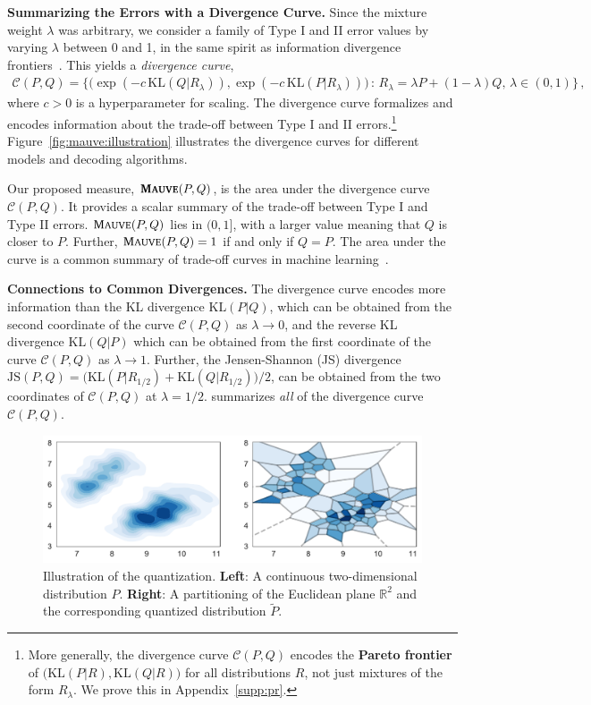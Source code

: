 \documentclass{article}
\newcommand{\myparagraph}[1]{\par\noindent\textbf{{#1}.}} %
\newcommand \Ccal {\mathcal C}
\theoremstyle{definition}
\newcommand{\kl}{{\mathrm{KL}}}
\newcommand \reals {\mathbb{R}}
\newcommand{\name}{{\fontfamily{bch}\selectfont{\textsc{Mauve}}}\xspace}
\begin{document}
\myparagraph{Summarizing the Errors with a Divergence Curve}
Since the mixture weight $\lambda$ was arbitrary, 
we consider a family of Type I and II error values by varying $\lambda$ between 0 and 1,
in the same spirit as information divergence frontiers~\citep{sajjadi2018assessing,djolonga2020precision}.
This yields a {\em divergence curve},
\begin{align} \label{eq:div-curve}
    \Ccal(P, Q) =
    \Big\{ \big(\exp(-c\, \kl(Q|R_\lambda)), \exp(-c\, \kl(P|R_\lambda)) \big)
    \, :\, 
    R_\lambda = \lambda P + (1-\lambda)Q, \,
    \lambda \in (0, 1) \Big\} \,,
\end{align}
where $c > 0$ is a hyperparameter 
for scaling.
The divergence curve formalizes and encodes information about the trade-off between Type I and II errors.\footnote{More generally, 
the divergence curve $\Ccal(P, Q)$
encodes the \textbf{Pareto frontier}
of $\big(\kl(P|R), \kl(Q|R)\big)$
for all distributions $R$,
not just mixtures of the form $R_\lambda$. 
We prove this in Appendix~\ref{supp:pr}.
%
}
%
Figure~\ref{fig:mauve:illustration} illustrates the divergence curves for different models and decoding algorithms.


Our proposed measure, 
$\textbf{\name}(P,Q)$, is the area under the divergence curve $\Ccal(P, Q)$. 
It provides a scalar summary of the trade-off between Type I and Type II errors.
$\name(P,Q)$ lies in $(0,1]$, with a larger value 
meaning that $Q$ is closer to $P$. Further, 
$\name(P, Q) = 1$ if and only if $Q=P$. %
The area under the curve is a common summary of trade-off curves in machine learning~\cite{cortes2005confidence,clemencon2009precision, clemenccon2010overlaying, flach2012machine}.

\myparagraph{Connections to Common Divergences}
The divergence curve encodes more information
than the KL divergence $\kl(P|Q)$, which can be obtained from the second coordinate of the curve $\Ccal(P, Q)$ as $\lambda \to 0$, and the reverse KL divergence $\kl(Q|P)$ which can be obtained from the first coordinate of the curve $\Ccal(P, Q)$ as $\lambda \to 1$. 
%
%
Further, the Jensen-Shannon (JS) divergence $\mathrm{JS}(P, Q) = \big(\kl(P|R_{1/2}) + \kl(Q|R_{1/2})\big)/2$, 
can be obtained from the two coordinates of $\Ccal(P, Q)$ at $\lambda=1/2$.
\name summarizes {\em all} of the divergence curve $\Ccal(P, Q)$.



\begin{figure}[t]
    \centering
    \includegraphics[width=0.8\linewidth]{fig/illustration/quant.pdf}
    \caption{\small
    Illustration of the quantization.
    \textbf{Left}: A continuous two-dimensional distribution $P$.
    \textbf{Right}: A partitioning of the Euclidean plane $\reals^2$ and the corresponding quantized distribution $\tilde P$.
    }
    \label{fig:mauve:quant}
\end{figure}
\end{document}
